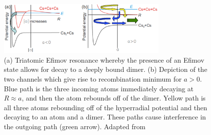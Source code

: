 \documentclass[prl,onecolumn,amsmath,amssymb,titlepage,nofootinbib,preprint]{revtex4-1}
\begin{document}
	\begin{figure}
		\includegraphics[width=0.75\textwidth]{Figures/efimov_recombination_coupling}
		\caption{(a) Triatomic Efimov resonance whereby the presence of an Efimov state allows for decay to a deeply bound dimer. (b) Depiction of the two channels which give rise to recombination minimum for $a>0$.  Blue path is the three incoming atoms immediately decaying at $R\approx a$, and then the atom rebounds off of the dimer.  Yellow path is all three atoms rebounding off of the hyperradial potential and then decaying to an atom and a dimer.  These paths cause interference in the outgoing path (green arrow). Adapted from \cite{Kraemer2006}}
		\label{fig:efimov_recombin_coupling}
	\end{figure}
\end{document}
